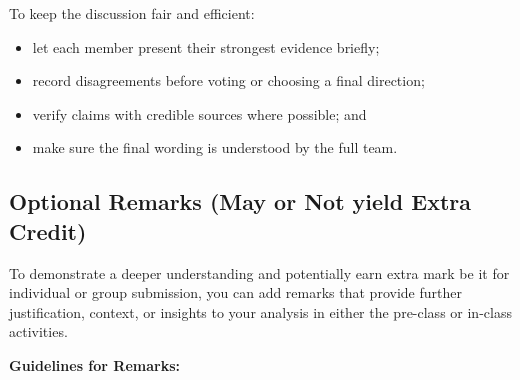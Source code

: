 To keep the discussion fair and efficient:
\begin{itemize}
    \item let each member present their strongest evidence briefly;
    \item record disagreements before voting or choosing a final direction;
    \item verify claims with credible sources where possible; and
    \item make sure the final wording is understood by the full team.
\end{itemize}

\subsection*{Optional Remarks (May or Not yield Extra Credit)}

To demonstrate a deeper understanding and potentially earn extra mark be it for individual or group submission, you can add remarks that provide further justification, context, or insights to your analysis in either the pre-class or in-class activities.

\textbf{Guidelines for Remarks:}

